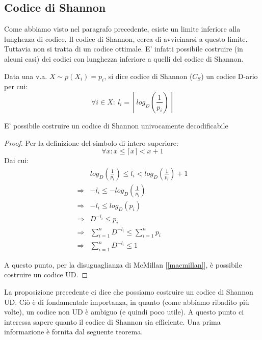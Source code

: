 \subsection{Codice di Shannon}
Come abbiamo visto nel paragrafo precedente, esiste un limite inferiore alla lunghezza di codice.
Il codice di Shannon, cerca di avvicinarsi a questo limite.
Tuttavia non si tratta di un codice ottimale. E' infatti possibile costruire (in alcuni casi) dei codici con 
lunghezza inferiore a quelli del codice di Shannon.

\begin{definizione}
Data una v.a. $X \sim p(X_i)=p_i$, si dice codice di Shannon ($C_S$) un codice D-ario per cui:
\[
 \forall i \in X: \ l_i=\left \lceil log_D \left (\frac{1}{p_i} \right) \right \rceil
\]

\end{definizione}

\begin{proposizione}E' possibile costruire un codice di Shannon univocamente decodificabile
 \begin{proof}
  Per la definizione del simbolo di intero superiore:
  \[
   \forall x: x \le \lceil x \rceil < x+1
  \]
   Dai cui:
   \[\begin{split}
    & log_D \left( \frac{1}{p_i} \right) \le l_i < log_D \left( \frac{1}{p_i} \right)+1 \\
    \Rightarrow & -l_i \le -log_D \left( \frac{1}{p_i} \right) \\
    \Rightarrow & -l_i \le log_D(p_i) \\
    \Rightarrow & D^{-l_i} \le p_i \\
    \Rightarrow & \sum_{i=1}^n D^{-l_i} \le \sum_{i=1}^n p_i \\
    \Rightarrow & \sum_{i=1}^n D^{-l_i} \le 1
     \end{split}
   \]
   
   \noindent
   A questo punto, per la disuguaglianza di McMillan [\ref{macmillan}], è possibile costruire un codice UD.
 \end{proof}

\end{proposizione}

La proposizione precedente ci dice che possiamo costruire un codice di Shannon UD. Ciò è di fondamentale 
importanza, in quanto (come abbiamo ribadito più volte), un codice non UD è ambiguo (e quindi poco utile).
A questo punto ci interessa sapere quanto il codice di Shannon sia efficiente.
Una prima informazione è fornita dal seguente teorema.

